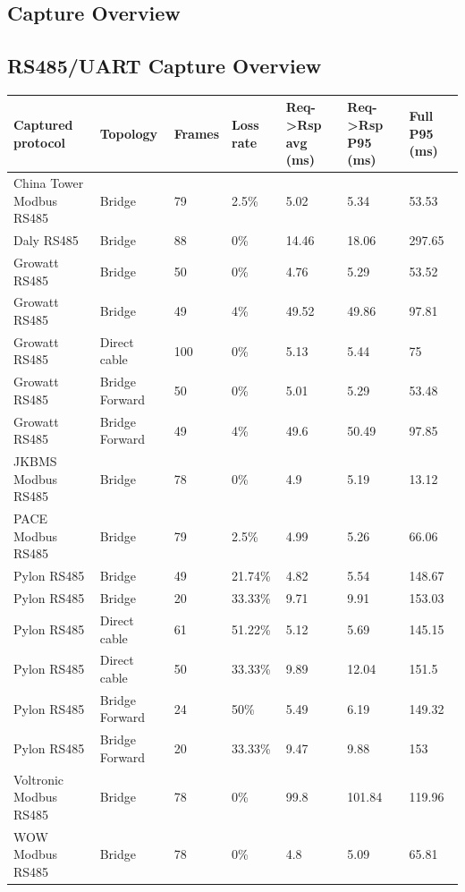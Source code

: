 \documentclass[11pt,a4paper]{article}
\begin{document}
\begin{landscape}

\section{Capture Overview}

\subsection{RS485/UART Capture Overview}
\begingroup
\scriptsize
\setlength{\tabcolsep}{3pt}
\setlength{\LTpre}{0.35em}
\setlength{\LTpost}{0.45em}
\begin{longtable}{@{}L{4.8cm}L{2.35cm}L{1.4cm}L{1.5cm}L{2.25cm}L{2.25cm}L{2.1cm}@{}}
\toprule
Captured protocol & Topology & Frames & Loss rate & Req->Rsp avg (ms) & Req->Rsp P95 (ms) & Full P95 (ms) \\
\midrule
\endhead
China Tower Modbus RS485 & Bridge & 79 & 2.5\% & 5.02 & 5.34 & 53.53 \\
Daly RS485 & Bridge & 88 & 0\% & 14.46 & 18.06 & 297.65 \\
Growatt RS485 & Bridge & 50 & 0\% & 4.76 & 5.29 & 53.52 \\
Growatt RS485 & Bridge & 49 & 4\% & 49.52 & 49.86 & 97.81 \\
Growatt RS485 & Direct cable & 100 & 0\% & 5.13 & 5.44 & 75 \\
Growatt RS485 & Bridge Forward & 50 & 0\% & 5.01 & 5.29 & 53.48 \\
Growatt RS485 & Bridge Forward & 49 & 4\% & 49.6 & 50.49 & 97.85 \\
JKBMS Modbus RS485 & Bridge & 78 & 0\% & 4.9 & 5.19 & 13.12 \\
PACE Modbus RS485 & Bridge & 79 & 2.5\% & 4.99 & 5.26 & 66.06 \\
Pylon RS485 & Bridge & 49 & 21.74\% & 4.82 & 5.54 & 148.67 \\
Pylon RS485 & Bridge & 20 & 33.33\% & 9.71 & 9.91 & 153.03 \\
Pylon RS485 & Direct cable & 61 & 51.22\% & 5.12 & 5.69 & 145.15 \\
Pylon RS485 & Direct cable & 50 & 33.33\% & 9.89 & 12.04 & 151.5 \\
Pylon RS485 & Bridge Forward & 24 & 50\% & 5.49 & 6.19 & 149.32 \\
Pylon RS485 & Bridge Forward & 20 & 33.33\% & 9.47 & 9.88 & 153 \\
Voltronic Modbus RS485 & Bridge & 78 & 0\% & 99.8 & 101.84 & 119.96 \\
WOW Modbus RS485 & Bridge & 78 & 0\% & 4.8 & 5.09 & 65.81 \\
\bottomrule
\end{longtable}
\endgroup






\end{landscape}
\end{document}
